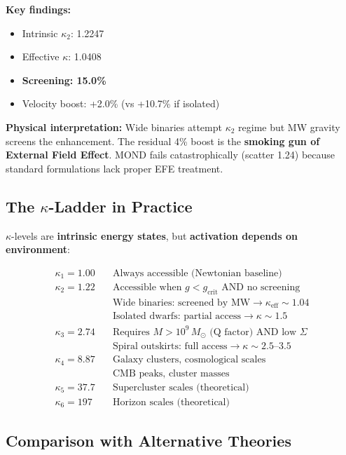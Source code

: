 \documentclass[11pt,a4paper]{article}
\theoremstyle{definition}
\theoremstyle{remark}
\begin{document}
	\textbf{Key findings:}
	\begin{itemize}
		\item Intrinsic $\kappa_2$: 1.2247
		\item Effective $\kappa$: 1.0408
		\item \textbf{Screening: 15.0\%}
		\item Velocity boost: +2.0\% (vs +10.7\% if isolated)
	\end{itemize}
	
	\textbf{Physical interpretation:} Wide binaries attempt $\kappa_2$ regime but MW gravity screens the enhancement. The residual 4\% boost is the \textbf{smoking gun of External Field Effect}. MOND fails catastrophically (scatter 1.24) because standard formulations lack proper EFE treatment.
	
	\subsection{The $\kappa$-Ladder in Practice}
	
	$\kappa$-levels are \textbf{intrinsic energy states}, but \textbf{activation depends on environment}:
	
	\begin{align*}
		\kappa_1 = 1.00 &\quad \text{Always accessible (Newtonian baseline)} \\
		\kappa_2 = 1.22 &\quad \text{Accessible when } g < g_{\text{crit}} \text{ AND no screening} \\
		&\quad \text{Wide binaries: screened by MW} \to \kappa_{\text{eff}} \sim 1.04 \\
		&\quad \text{Isolated dwarfs: partial access} \to \kappa \sim 1.5 \\
		\kappa_3 = 2.74 &\quad \text{Requires } M > 10^9\, M_\odot \text{ (Q factor) AND low } \Sigma \\
		&\quad \text{Spiral outskirts: full access} \to \kappa \sim 2.5\text{--}3.5 \\
		\kappa_4 = 8.87 &\quad \text{Galaxy clusters, cosmological scales} \\
		&\quad \text{CMB peaks, cluster masses} \\
		\kappa_5 = 37.7 &\quad \text{Supercluster scales (theoretical)} \\
		\kappa_6 = 197 &\quad \text{Horizon scales (theoretical)}
	\end{align*}
	
	\subsection{Comparison with Alternative Theories}
	
\end{document}
